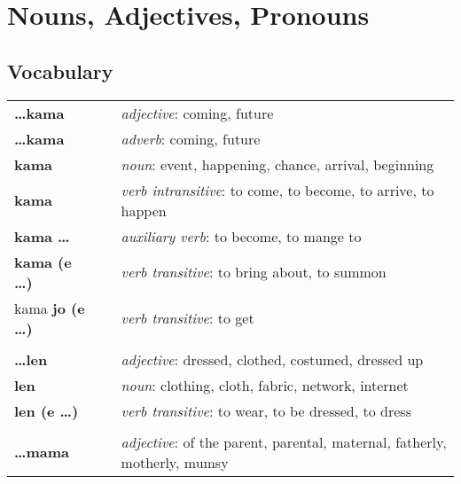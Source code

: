 
\section{Nouns, Adjectives, Pronouns}
\subsection*{Vocabulary}
\begin{supertabular}{p{2,5cm}|ll}
    \textbf{\dots kama}        &  & \textit{adjective}: coming, future                                                      \\
    \textbf{\dots kama}        &  & \textit{adverb}: coming, future                                                         \\
    \textbf{kama}              &  & \textit{noun}: event, happening, chance, arrival, beginning                             \\
    \textbf{kama}              &  & \textit{verb intransitive}: to come, to become, to arrive, to happen                    \\
    \textbf{kama \dots}        &  & \textit{auxiliary verb}: to become, to mange to                                         \\
    \textbf{kama (e \dots)}    &  & \textit{verb transitive}: to bring about, to summon                                     \\
    kama \textbf{jo (e \dots)} &  & \textit{verb transitive}: to get                                                        \\
                               &  &                                                                                         \\
    \textbf{\dots len}         &  & \textit{adjective}: dressed, clothed, costumed, dressed up                              \\
    \textbf{len}               &  & \textit{noun}: clothing, cloth, fabric, network, internet                               \\
    \textbf{len (e \dots)}     &  & \textit{verb transitive}: to wear, to be dressed, to dress                              \\
                               &  &                                                                                         \\
    \textbf{\dots mama}        &  & \textit{adjective}: of the parent, parental, maternal, fatherly, motherly, mumsy        \\

\end{supertabular}
